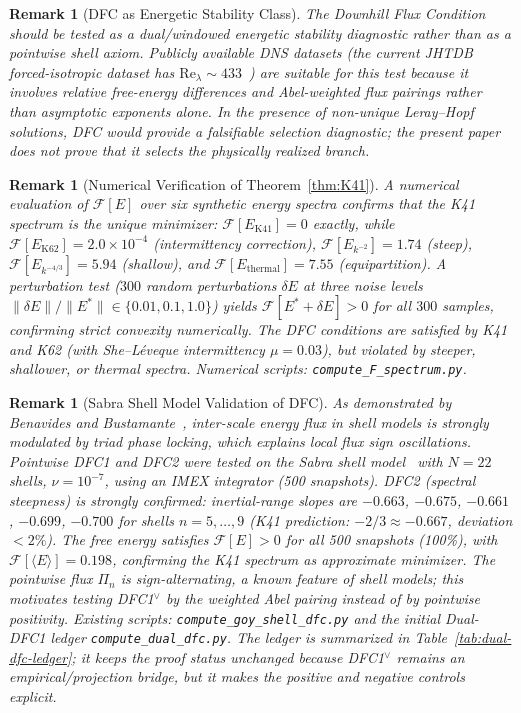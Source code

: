 \documentclass[12pt,a4paper]{article}
\theoremstyle{breakdef}
\theoremstyle{breakplain}
\theoremstyle{breakdef}
\newtheorem{remark}[definition]{Remark}
\begin{document}
\begin{remark}[DFC as Energetic Stability Class]\label{rem:dfc-stability}
The Downhill Flux Condition should be tested as a dual/windowed energetic
stability diagnostic rather than as a pointwise shell axiom. Publicly
available DNS datasets (the current JHTDB forced-isotropic dataset has
$\mathrm{Re}_\lambda \sim 433$~\cite{JHTDB08,JHTDBForcedIsotropic})
are suitable for this test because it involves relative free-energy
differences and Abel-weighted flux pairings rather than asymptotic exponents
alone. In the presence of non-unique Leray--Hopf solutions, DFC would provide
a falsifiable selection diagnostic; the present paper does not prove that it
selects the physically realized branch.
\end{remark}

\begin{remark}[Numerical Verification of Theorem~\ref{thm:K41}]\label{rem:numerical-F}
A numerical evaluation of $\mathcal{F}[E]$ over six synthetic energy spectra confirms that the K41 spectrum is the unique minimizer: $\mathcal{F}[E_{\mathrm{K41}}] = 0$ exactly, while $\mathcal{F}[E_{\mathrm{K62}}] = 2.0 \times 10^{-4}$ (intermittency correction), $\mathcal{F}[E_{k^{-2}}] = 1.74$ (steep), $\mathcal{F}[E_{k^{-4/3}}] = 5.94$ (shallow), and $\mathcal{F}[E_{\mathrm{thermal}}] = 7.55$ (equipartition). A perturbation test ($300$ random perturbations $\delta E$ at three noise levels $\|\delta E\|/\|E^*\| \in \{0.01, 0.1, 1.0\}$) yields $\mathcal{F}[E^* + \delta E] > 0$ for \emph{all} $300$ samples, confirming strict convexity numerically. The DFC conditions are satisfied by K41 and K62 (with She--Léveque intermittency $\mu = 0.03$), but violated by steeper, shallower, or thermal spectra. Numerical scripts: \texttt{compute\_F\_spectrum.py}.
\end{remark}

\begin{remark}[Sabra Shell Model Validation of DFC]
\label{rem:sabra-dfc}
As demonstrated by Benavides and Bustamante~\cite{BenavidesBustamante2025}, inter-scale energy flux in shell models is strongly modulated by triad phase locking, which explains local flux sign oscillations. Pointwise DFC1 and DFC2 were tested on the Sabra shell model~\cite{Lvov98} with $N=22$ shells, $\nu = 10^{-7}$, using an IMEX integrator (500 snapshots). DFC2 (spectral steepness) is strongly confirmed: inertial-range slopes are $-0.663$, $-0.675$, $-0.661$, $-0.699$, $-0.700$ for shells $n=5,\ldots,9$ (K41 prediction: $-2/3 \approx -0.667$, deviation $< 2\%$). The free energy satisfies $\mathcal{F}[E] > 0$ for all 500 snapshots (100\%), with $\mathcal{F}[\langle E \rangle] = 0.198$, confirming the K41 spectrum as approximate minimizer. The pointwise flux $\Pi_n$ is sign-alternating, a known feature of shell models; this motivates testing DFC1$^\vee$ by the weighted Abel pairing instead of by pointwise positivity. Existing scripts: \texttt{compute\_goy\_shell\_dfc.py} and the initial Dual-DFC1 ledger \texttt{compute\_dual\_dfc.py}. The ledger is summarized in Table~\ref{tab:dual-dfc-ledger}; it keeps the proof status unchanged because DFC1$^\vee$ remains an empirical/projection bridge, but it makes the positive and negative controls explicit.
\end{remark}
\end{document}
